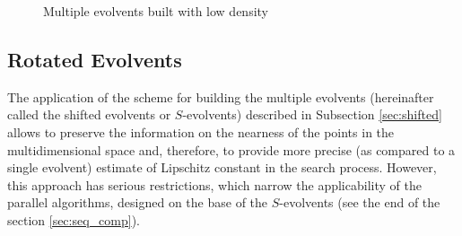 \documentclass[runningheads]{llncs}
\begin{document}
\begin{figure}[ht]
    \centering
    \caption{Multiple evolvents built with low density }
\end{figure}

\subsection{Rotated Evolvents}
The application of the scheme for building the multiple evolvents (hereinafter called the shifted
evolvents or $S$-evolvents) described in Subsection \ref{sec:shifted} allows to preserve the
information on the nearness of the points in the multidimensional space and, therefore, to
provide more precise (as compared to a single evolvent) estimate of Lipschitz constant in the
search process. However, this approach has serious restrictions, which narrow the applicability
of the parallel algorithms, designed on the base of the $S$-evolvents (see the end of the section
\ref{sec:seq_comp}).
\end{document}
